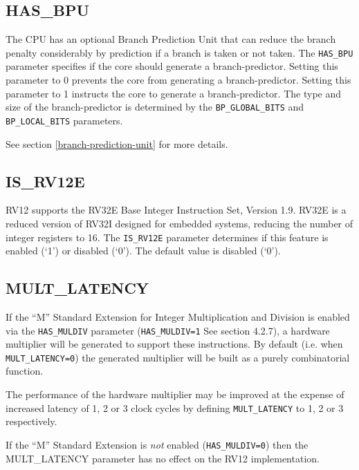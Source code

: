 \subsection{HAS\_BPU}\label{has_bpu}

The CPU has an optional Branch Prediction Unit that can reduce the
branch penalty considerably by prediction if a branch is taken or not
taken. The \texttt{HAS\_BPU} parameter specifies if the core should generate a
branch-predictor. Setting this parameter to 0 prevents the core from
generating a branch-predictor. Setting this parameter to 1 instructs the
core to generate a branch-predictor. The type and size of the
branch-predictor is determined by the \texttt{BP\_GLOBAL\_BITS} and
\texttt{BP\_LOCAL\_BITS} parameters.

See section \ref{branch-prediction-unit}  for more details.

\subsection{IS\_RV12E}\label{is_rv12e}

RV12 supports the RV32E Base Integer Instruction Set, Version 1.9. RV32E
is a reduced version of RV32I designed for embedded systems, reducing
the number of integer registers to 16. The \texttt{IS\_RV12E} parameter
determines if this feature is enabled (`1') or disabled (`0'). The
default value is disabled (`0').

\subsection{MULT\_LATENCY}\label{mult_latency}

If the ``M'' Standard Extension for Integer Multiplication and Division
is enabled via the \texttt{HAS\_MULDIV} parameter (\texttt{HAS\_MULDIV=1} See section
4.2.7), a hardware multiplier will be generated to support these
instructions. By default (i.e. when \texttt{MULT\_LATENCY=0}) the generated multiplier will
be built as a purely combinatorial function.

The performance of the hardware multiplier may be improved at the
expense of increased latency of 1, 2 or 3 clock cycles by defining
\texttt{MULT\_LATENCY} to 1, 2 or 3 respectively.

If the ``M'' Standard Extension is \emph{not} enabled (\texttt{HAS\_MULDIV=0})
then the MULT\_LATENCY parameter has no effect on the RV12
implementation.

